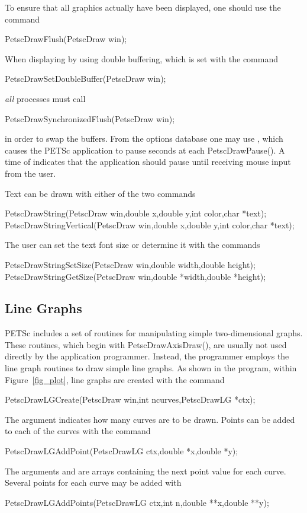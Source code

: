 {{{To ensure that all graphics actually have been displayed, one should use
 the
command
\begin{tabbing}
  PetscDrawFlush(PetscDraw win);
\end{tabbing}
When displaying by using double buffering, which is set with the
command  
\begin{tabbing}
  PetscDrawSetDoubleBuffer(PetscDraw win);
\end{tabbing}
{\em all} processes must call
\begin{tabbing}
  PetscDrawSynchronizedFlush(PetscDraw win);
\end{tabbing}
in order to swap the buffers. From the options database one may use
 , which  causes the PETSc application
to pause  seconds at each PetscDrawPause(). A time of 
indicates that the application should pause until receiving mouse
input from the user.

Text can be drawn with either of the two
commands 
\begin{tabbing}
  PetscDrawString(PetscDraw win,double x,double y,int color,char *text);\\
  PetscDrawStringVertical(PetscDraw win,double x,double y,int color,char *text);
\end{tabbing}
The user can set the text font size or determine it with the
commands
\begin{tabbing}
  PetscDrawStringSetSize(PetscDraw win,double width,double height);\\
  PetscDrawStringGetSize(PetscDraw win,double *width,double *height);
\end{tabbing}

\subsection{Line Graphs}
PETSc includes a set of routines for manipulating simple two-dimensional
graphs. These routines, which begin with PetscDrawAxisDraw(), are usually
not used directly by the application programmer.  Instead, the programmer
employs the line graph routines to draw simple line graphs.
As shown in the program, within Figure~\ref{fig_plot}, line graphs
are created with the command  
\begin{tabbing}
  PetscDrawLGCreate(PetscDraw win,int ncurves,PetscDrawLG *ctx);
\end{tabbing}
The argument  indicates how many curves are to be drawn.
Points can be added to each of the curves with the
command
\begin{tabbing}
  PetscDrawLGAddPoint(PetscDrawLG ctx,double *x,double *y);
\end{tabbing}
The arguments  and  are arrays containing the next
point value for each curve.
Several points for each curve may be added with
\begin{tabbing}
  PetscDrawLGAddPoints(PetscDrawLG ctx,int n,double **x,double **y);
\end{tabbing}

}}}
